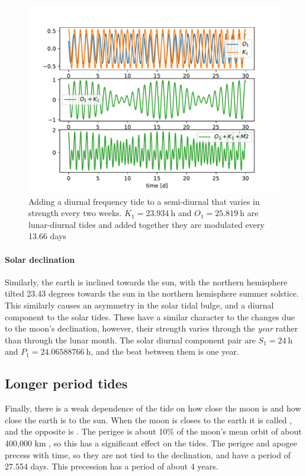  \begin{figure}[hbt]
  \begin{center}
    \includegraphics{figs/Waves/M2K1}
    \caption{Adding a diurnal frequency tide to a semi-diurnal that varies in strength every two weeks. $K_1=23.934 \ \mathrm{h}$ and $O_1 = 25.819\ \mathrm{h}$ are lunar-diurnal tides and added together they are modulated every 13.66 days}
    \label{fig:M2K1}  
  \end{center}
\end{figure}

\paragraph{Solar declination} Similarly, the earth is inclined towards the sun, with the northern hemisphere tilted 23.43 degrees towards the sun in the northern hemisphere summer solstice.  This similarly causes an asymmetry in the solar tidal bulge, and a diurnal component to the solar tides.  These have a similar character to the changes due to the moon's declination, however, their strength varies through the \emph{year} rather than through the lunar month.  The solar diurnal component pair are $S_1=24\ \mathrm{h}$ and $P_1=24.06588766\ \mathrm{h}$, and the beat between them is one year.  

\subsection{Longer period tides}  Finally, there is a weak dependence of the tide on how close the moon is and how close the earth is to the sun.  When the moon is closes to the earth it is called , and the opposite is .  The perigee is about 10\% of the moon's mean orbit of about 400,000 km , so this has a significant effect on the tides.  The perigee and apogee precess with time, so they are not tied to the declination, and have a period of 27.554 days.  This precession has a period of about 4 years.  

